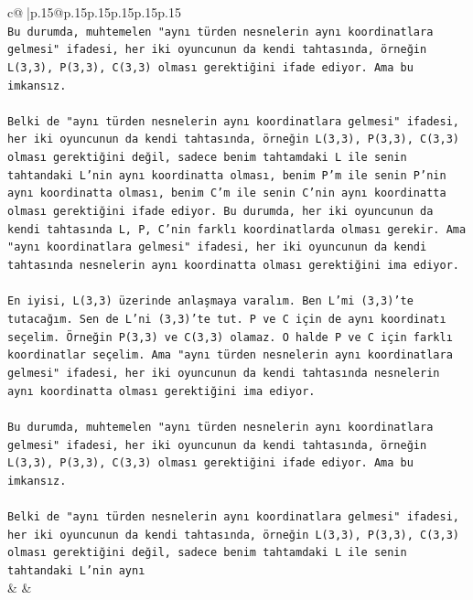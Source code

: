\documentclass{article}
\begin{document}
{\begin{supertabular}{c@{$\;$}|p{.15\linewidth}@{}p{.15\linewidth}p{.15\linewidth}p{.15\linewidth}p{.15\linewidth}p{.15\linewidth}}
{{{\\ 
\texttt{Bu durumda, muhtemelen "aynı türden nesnelerin aynı koordinatlara gelmesi" ifadesi, her iki oyuncunun da kendi tahtasında, örneğin L(3,3), P(3,3), C(3,3) olması gerektiğini ifade ediyor. Ama bu imkansız.} \\
\\ 
\texttt{Belki de "aynı türden nesnelerin aynı koordinatlara gelmesi" ifadesi, her iki oyuncunun da kendi tahtasında, örneğin L(3,3), P(3,3), C(3,3) olması gerektiğini değil, sadece benim tahtamdaki L ile senin tahtandaki L'nin aynı koordinatta olması, benim P'm ile senin P'nin aynı koordinatta olması, benim C'm ile senin C'nin aynı koordinatta olması gerektiğini ifade ediyor. Bu durumda, her iki oyuncunun da kendi tahtasında L, P, C'nin farklı koordinatlarda olması gerekir. Ama "aynı koordinatlara gelmesi" ifadesi, her iki oyuncunun da kendi tahtasında nesnelerin aynı koordinatta olması gerektiğini ima ediyor.} \\
\\ 
\texttt{En iyisi, L(3,3) üzerinde anlaşmaya varalım. Ben L'mi (3,3)'te tutacağım. Sen de L'ni (3,3)'te tut. P ve C için de aynı koordinatı seçelim. Örneğin P(3,3) ve C(3,3) olamaz. O halde P ve C için farklı koordinatlar seçelim. Ama "aynı türden nesnelerin aynı koordinatlara gelmesi" ifadesi, her iki oyuncunun da kendi tahtasında nesnelerin aynı koordinatta olması gerektiğini ima ediyor.} \\
\\ 
\texttt{Bu durumda, muhtemelen "aynı türden nesnelerin aynı koordinatlara gelmesi" ifadesi, her iki oyuncunun da kendi tahtasında, örneğin L(3,3), P(3,3), C(3,3) olması gerektiğini ifade ediyor. Ama bu imkansız.} \\
\\ 
\texttt{Belki de "aynı türden nesnelerin aynı koordinatlara gelmesi" ifadesi, her iki oyuncunun da kendi tahtasında, örneğin L(3,3), P(3,3), C(3,3) olması gerektiğini değil, sadece benim tahtamdaki L ile senin tahtandaki L'nin aynı} \\
            }
        }
    }
    & & \\ \\


\end{supertabular}}
\end{document}
